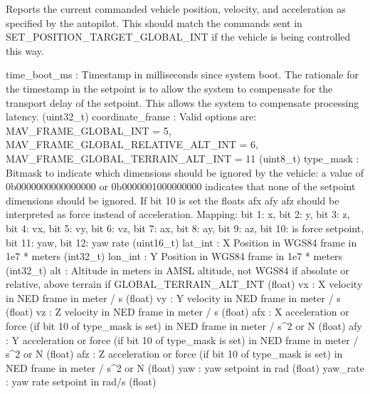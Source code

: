\begin{DoxyVerb}
\begin{DoxyVerb}
\begin{DoxyVerb}
\begin{DoxyVerb}
\begin{DoxyVerb}Reports the current commanded vehicle position, velocity, and
acceleration as specified by the autopilot. This
should match the commands sent in
SET_POSITION_TARGET_GLOBAL_INT if the vehicle is being
controlled this way.

time_boot_ms              : Timestamp in milliseconds since system boot. The rationale for the timestamp in the setpoint is to allow the system to compensate for the transport delay of the setpoint. This allows the system to compensate processing latency. (uint32_t)
coordinate_frame          : Valid options are: MAV_FRAME_GLOBAL_INT = 5, MAV_FRAME_GLOBAL_RELATIVE_ALT_INT = 6, MAV_FRAME_GLOBAL_TERRAIN_ALT_INT = 11 (uint8_t)
type_mask                 : Bitmask to indicate which dimensions should be ignored by the vehicle: a value of 0b0000000000000000 or 0b0000001000000000 indicates that none of the setpoint dimensions should be ignored. If bit 10 is set the floats afx afy afz should be interpreted as force instead of acceleration. Mapping: bit 1: x, bit 2: y, bit 3: z, bit 4: vx, bit 5: vy, bit 6: vz, bit 7: ax, bit 8: ay, bit 9: az, bit 10: is force setpoint, bit 11: yaw, bit 12: yaw rate (uint16_t)
lat_int                   : X Position in WGS84 frame in 1e7 * meters (int32_t)
lon_int                   : Y Position in WGS84 frame in 1e7 * meters (int32_t)
alt                       : Altitude in meters in AMSL altitude, not WGS84 if absolute or relative, above terrain if GLOBAL_TERRAIN_ALT_INT (float)
vx                        : X velocity in NED frame in meter / s (float)
vy                        : Y velocity in NED frame in meter / s (float)
vz                        : Z velocity in NED frame in meter / s (float)
afx                       : X acceleration or force (if bit 10 of type_mask is set) in NED frame in meter / s^2 or N (float)
afy                       : Y acceleration or force (if bit 10 of type_mask is set) in NED frame in meter / s^2 or N (float)
afz                       : Z acceleration or force (if bit 10 of type_mask is set) in NED frame in meter / s^2 or N (float)
yaw                       : yaw setpoint in rad (float)
yaw_rate                  : yaw rate setpoint in rad/s (float)\end{DoxyVerb}
 \mbox{\label{classpymavlink_1_1dialects_1_1v10_1_1MAVLink_a1f8c63e991094848c433446005db0671}} 

\end{DoxyVerb}
\end{DoxyVerb}
\end{DoxyVerb}
\end{DoxyVerb}
